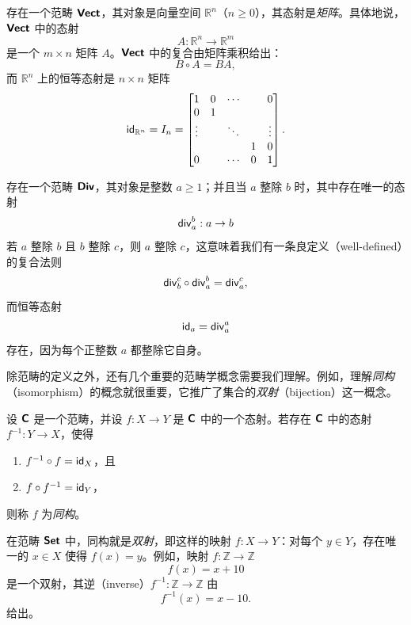 \begin{example}
        存在一个范畴 ${\boldsymbol{\mathsf{Vect}}}$，其对象是向量空间 $\mathbb{R}^n$（$n \geq 0$），其态射是{\it 矩阵}。具体地说，${\boldsymbol{\mathsf{Vect}}}$ 中的态射
        \[A: \mathbb{R}^n \to \mathbb{R}^m\]
        是一个 $m \times n$ 矩阵 $A$。${\boldsymbol{\mathsf{Vect}}}$ 中的复合由矩阵乘积给出：
        \[
        B \circ A = BA,
        \]
        而 $\mathbb{R}^n$ 上的恒等态射是 $n \times n$ 矩阵
        \[
        \mathsf{id}_{\mathbb{R}^n} = I_n =  \begin{bmatrix}
            1 & 0 & \cdots & &  0\\
            0 & 1 &  & &  \\
            \vdots  & & \ddots& &  \vdots \\
             & & & 1 & 0 \\
             0&  & \cdots  & 0 & 1
        \end{bmatrix}.
        \]
\end{example}

\begin{example}
    存在一个范畴 ${\boldsymbol{\mathsf{Div}}}$，其对象是整数 $a \geq 1$；并且当 $a$ 整除 $b$ 时，其中存在唯一的态射
    \[
    \mathsf{div}_{a}^b:a \to b
    \]
    若 $a$ 整除 $b$ 且 $b$ 整除 $c$，则 $a$ 整除 $c$，这意味着我们有一条良定义（well-defined）的复合法则
    \[
    \mathsf{div}_b^c \circ \mathsf{div}_a^b = \mathsf{div}_a^c,
    \]
    而恒等态射
    \[
    \mathsf{id}_a = \mathsf{div}_a^a
    \]
    存在，因为每个正整数 $a$ 都整除它自身。
\end{example}

除范畴的定义之外，还有几个重要的范畴学概念需要我们理解。例如，理解{\it 同构}（isomorphism）的概念就很重要，它推广了集合的{\it 双射}（bijection）这一概念。
\begin{definition}
设 ${\boldsymbol{\mathsf{C}}}$ 是一个范畴，并设 $f:X \to Y$ 是 ${\boldsymbol{\mathsf{C}}}$ 中的一个态射。若存在 ${\boldsymbol{\mathsf{C}}}$ 中的态射 $f^{-1}: Y \to X$，使得
\begin{enumerate}
\item $f^{-1} \circ f = \mathsf{id}_X$，且
\item $f \circ f^{-1} = \mathsf{id}_Y$，
\end{enumerate}
则称 $f$ 为{\it 同构}。
\end{definition}

\begin{example}
    在范畴 ${\boldsymbol{\mathsf{Set}}}$ 中，同构就是{\it 双射}，即这样的映射 $f:X \to Y$：对每个 $y \in Y$，存在唯一的 $x \in X$ 使得 $f(x) = y$。例如，映射 $f:\mathbb{Z} \to \mathbb{Z}$
    \[f(x) = x+10\]
    是一个双射，其逆（inverse）$f^{-1}:\mathbb{Z} \to \mathbb{Z}$ 由
    \[
    f^{-1}(x) = x-10.
    \]
    给出。
\end{example}


